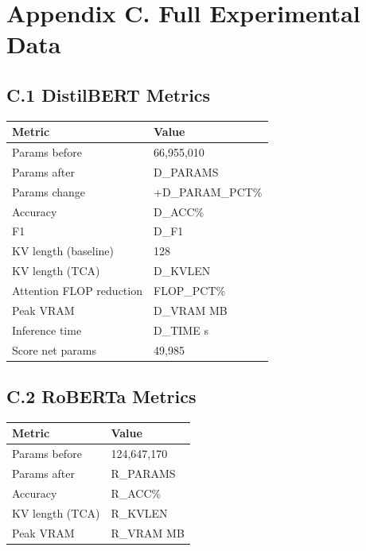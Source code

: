 \section{Appendix C. Full Experimental Data}

\subsection{C.1 DistilBERT Metrics}

\begin{table}[H]
\centering
\small
\begin{tabular}{ll}
\toprule
\textbf{Metric} & \textbf{Value} \\
\midrule
Params before & 66,955,010 \\
Params after & {{D\_PARAMS}} \\
Params change & +{{D\_PARAM\_PCT}}\% \\
Accuracy & {{D\_ACC}}\% \\
F1 & {{D\_F1}} \\
KV length (baseline) & 128 \\
KV length (TCA) & {{D\_KVLEN}} \\
Attention FLOP reduction & {{FLOP\_PCT}}\% \\
Peak VRAM & {{D\_VRAM}} MB \\
Inference time & {{D\_TIME}} s \\
Score net params & 49,985 \\
\bottomrule
\end{tabular}
\end{table}

\subsection{C.2 RoBERTa Metrics}

\begin{table}[H]
\centering
\small
\begin{tabular}{ll}
\toprule
\textbf{Metric} & \textbf{Value} \\
\midrule
Params before & 124,647,170 \\
Params after & {{R\_PARAMS}} \\
Accuracy & {{R\_ACC}}\% \\
KV length (TCA) & {{R\_KVLEN}} \\
Peak VRAM & {{R\_VRAM}} MB \\
\bottomrule
\end{tabular}
\end{table}

